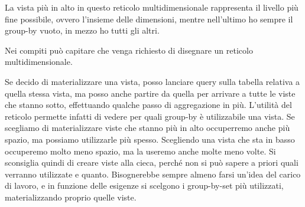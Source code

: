 \noindent La vista più in alto in questo reticolo multidimensionale rappresenta il livello più fine possibile, ovvero l'insieme delle dimensioni, mentre nell'ultimo ho sempre il group-by vuoto, in mezzo ho tutti gli altri.\newline
\begin{warn}
	Nei compiti può capitare che venga richiesto di disegnare un reticolo multidimensionale.
\end{warn}
Se decido di materializzare una vista, posso lanciare query sulla tabella relativa a quella stessa vista, ma posso anche partire da quella per arrivare a tutte le viste che stanno sotto, effettuando qualche passo di aggregazione in più.\newline
L'utilità del reticolo permette infatti di vedere per quali group-by è utilizzabile una vista.\newline
Se scegliamo di materializzare viste che stanno più in alto occuperremo anche più spazio, ma possiamo utilizzarle più spesso. Scegliendo una vista che sta in basso occuperemo molto meno spazio, ma la useremo anche molte meno volte.\newline
Si sconsiglia quindi di creare viste alla cieca, perché non si può sapere a priori  quali verranno utilizzate e quanto. Bisognerebbe sempre almeno farsi un'idea del carico di lavoro, e in funzione delle esigenze si scelgono i group-by-set più utilizzati, materializzando proprio quelle viste.\newline
